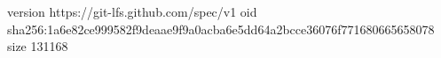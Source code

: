 version https://git-lfs.github.com/spec/v1
oid sha256:1a6e82ce999582f9deaae9f9a0acba6e5dd64a2bcce36076f771680665658078
size 131168
